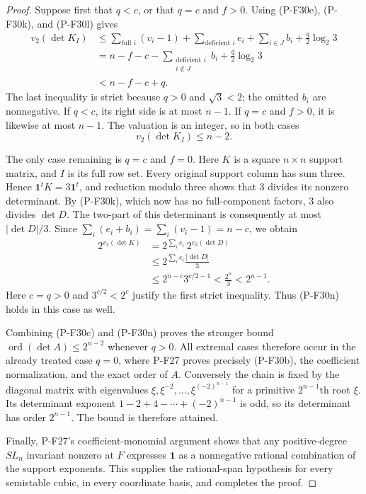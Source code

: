 \documentclass[11pt,a4paper]{article}
\begin{document}
\begin{proof}
Suppose first that $q<c$, or that $q=c$ and $f>0$.
Using (P-F30e), (P-F30k), and (P-F30l) gives
\begin{align*}
 v_2(\det K_I)
 &\le \sum_{\text{full }i}(v_i-1)
      +\sum_{\text{deficient }i}e_i
      +\sum_{i\in J}b_i+\frac q2\log_2 3\\
 &=n-f-c-\sum_{\substack{\text{deficient }i\\i\notin J}}b_i
              +\frac q2\log_2 3\\
 &<n-f-c+q.
 \tag{P-F30m}
\end{align*}
The last inequality is strict because $q>0$
and $\sqrt3<2$; the omitted $b_i$ are nonnegative.
If $q<c$, its right side is at most $n-1$.
If $q=c$ and $f>0$, it is likewise at most $n-1$.
The valuation is an integer, so in both cases
\[
 v_2(\det K_I)\le n-2.
 \tag{P-F30n}
\]

The only case remaining is $q=c$ and $f=0$.
Here $K$ is a square $n\times n$ support matrix,
and $I$ is its full row set. Every original
support column has sum three. Hence
$\mathbf1^tK=3\mathbf1^t$, and reduction modulo
three shows that $3$ divides its nonzero determinant.
By (P-F30k), which now has no full-component
factors, $3$ also divides $\det D$.
The two-part of this determinant is consequently
at most $|\det D|/3$. Since
$\sum_i(e_i+b_i)=\sum_i(v_i-1)=n-c$,
we obtain
\begin{align*}
 2^{v_2(\det K)}
 &=2^{\sum_i e_i}\,2^{v_2(\det D)}\\
 &\le 2^{\sum_i e_i}\frac{|\det D|}{3}\\
 &\le 2^{n-c}3^{c/2-1}
  <\frac{2^n}{3}
  <2^{n-1}.
 \tag{P-F30o}
\end{align*}
Here $c=q>0$ and $3^{c/2}<2^c$ justify the
first strict inequality. Thus (P-F30n) holds
in this case as well.

Combining (P-F30c) and (P-F30n) proves the
stronger bound
$\operatorname{ord}(\det A)\le2^{n-2}$
whenever $q>0$. All extremal cases therefore
occur in the already treated case $q=0$,
where P-F27 proves precisely (P-F30b), the
coefficient normalization, and the exact order
of $A$. Conversely the chain is fixed by
the diagonal matrix with eigenvalues
$\xi,\xi^{-2},\ldots,\xi^{(-2)^{n-1}}$
for a primitive $2^{n-1}$th root $\xi$.
Its determinant exponent
$1-2+4-\cdots+(-2)^{n-1}$ is odd, so its
determinant has order $2^{n-1}$. The bound
is therefore attained.

Finally, P-F27's coefficient-monomial argument
shows that any positive-degree $SL_n$ invariant
nonzero at $F$ expresses $\mathbf1$ as a
nonnegative rational combination of the
support exponents. This supplies the
rational-span hypothesis for every semistable
cubic, in every coordinate basis, and completes
the proof.
\end{proof}
\end{document}
